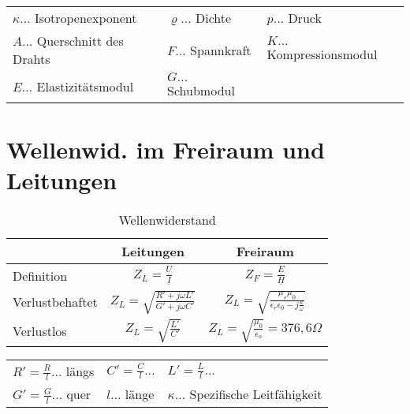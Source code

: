 		\begin{table}[h]
		\begin{tabular}{lll}
		$\kappa\dots$ Isotropenexponent & $\varrho\dots$ Dichte & $p\dots$ Druck\\
		$A\dots$ Querschnitt des Drahts & $F\dots$ Spannkraft & $K\dots$ Kompressionsmodul\\
		$E\dots$ Elastizitätsmodul & $G\dots$ Schubmodul\\
		\end{tabular}
		\end{table}

\clearpage

	\section{Wellenwid. im Freiraum und Leitungen}

		\begin{table}[here]
			\begin{tabular}{l c c}
				& Leitungen & Freiraum\\\toprule
				Definition & $Z_L = \frac{\underline{U}}{\underline{I}}$ & $Z_F = \frac{\underline{E}}{\underline{H}} $\\\midrule
				Verlustbehaftet & $Z_L = \sqrt{\frac{R' + j\omega L'}{G'+j\omega C'}}$ & $ Z_L  = \sqrt{\frac{\mu_r \mu_0}{\epsilon_r \epsilon_0 - j\frac{\kappa}{\omega}}} $ \\\midrule
				Verlustlos & $Z_L = \sqrt{\frac{L'}{C'}}$ &$Z_L = \sqrt{\frac{\mu_0}{\epsilon_o}} = 376,6 \Omega$\\\bottomrule
			\end{tabular}
			\caption{Wellenwiderstand}
		\end{table}
	
		\begin{table}[h]
		\begin{tabular}{lll}	
		$R' = \frac{R}{l} \dots$ längs & $C' = \frac{C}{l} \dots$ & $L' = \frac{L}{l} \dots$ \\
		$G' = \frac{G}{l} \dots$ quer & $l \dots$ länge & $\kappa \dots$ Spezifische Leitfähigkeit\\
		\end{tabular}
		\end{table}



